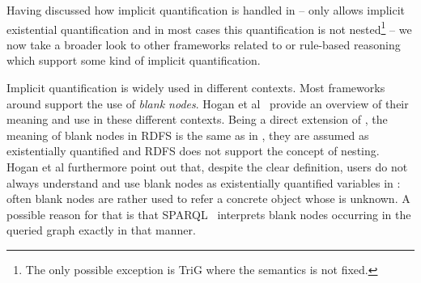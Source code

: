 \label{iq}
Having discussed how implicit quantification is handled in \rdf{} -- \rdf only allows implicit existential quantification and 
in most cases this quantification is not nested\footnote{The only possible exception is TriG where the semantics is not fixed.} -- we now take a broader look 
to other frameworks related to \rdf or rule-based reasoning which support some kind of implicit quantification.

Implicit quantification is widely used in different contexts. Most frameworks around \rdf support the use of \emph{blank nodes}. 
Hogan et al~\cite{blanks} provide an overview of their meaning and use in these different contexts. 
Being a direct extension of \rdf, the meaning of blank nodes in RDFS is the same as in \rdf, they are assumed as existentially quantified and RDFS does not support the concept of nesting.
Hogan et al furthermore point out that, despite the clear definition, users do not always understand and use blank nodes as existentially quantified variables in \rdf: 
often blank nodes are rather used to refer a concrete object whose \iri is unknown. %
A possible reason 
for that is that SPARQL~\cite{sparql} interprets blank nodes occurring in the queried \rdf graph exactly in that manner. 


